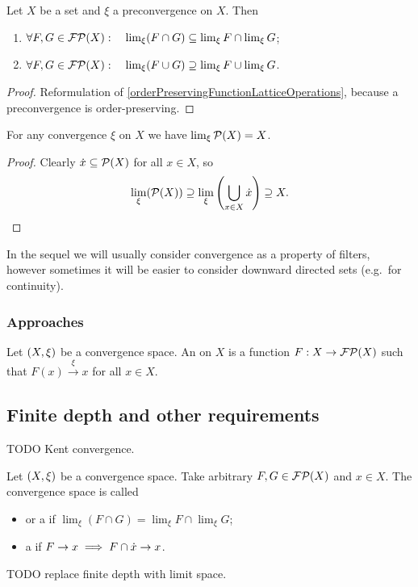 \begin{lemma}
Let $X$ be a set and $\xi$ a preconvergence on $X$. Then
\begin{enumerate}
\item $\forall F,G \in \operatorname{\mathcal{FP}}(X): \quad \lim_\xi(F\cap G) \subseteq \lim_\xi F \cap \lim_\xi G$;
\item $\forall F,G \in \operatorname{\mathcal{FP}}(X): \quad \lim_\xi(F\cup G) \supseteq \lim_\xi F \cup \lim_\xi G$.
\end{enumerate}
\end{lemma}
\begin{proof}
Reformulation of \ref{orderPreservingFunctionLatticeOperations}, because a preconvergence is order-preserving.
\end{proof}
\begin{corollary} \label{limitDegenerateFilter}
For any convergence $\xi$ on $X$ we have $\lim_\xi \operatorname{\mathcal{P}}(X) = X$.
\end{corollary}
\begin{proof}
Clearly $\dot{x} \subseteq \operatorname{\mathcal{P}}(X)$ for all $x\in X$, so
\[ \lim_\xi(\operatorname{\mathcal{P}}(X)) \supseteq \lim_\xi \left(\bigcup_{x\in X}\dot{x}\right) \supseteq X. \]
\end{proof}

In the sequel we will usually consider convergence as a property of filters, however sometimes it will be easier to consider downward directed sets (e.g.\ for continuity).

\subsubsection{Approaches}
\begin{definition}
Let $\left( X,\xi \right)$ be a convergence space. An  on $X$ is a function $F: X\to \operatorname{\mathcal{FP}}(X)$ such that $F(x) \overset{\xi}{\longrightarrow} x$ for all $x\in X$.
\end{definition}

\subsection{Finite depth and other requirements}
TODO Kent convergence.
\begin{definition}
Let $\left( X,\xi \right)$ be a convergence space. Take arbitrary $F,G \in \operatorname{\mathcal{FP}}(X)$ and $x\in X$. The convergence space is called
\begin{itemize}
\item {} or a  if $\lim_\xi(F\cap G) = \lim_\xi F \cap \lim_\xi G$;
\item a  if $F \to x \implies F\cap \dot{x} \to x$.
\end{itemize}
\end{definition}
TODO replace finite depth with limit space.

